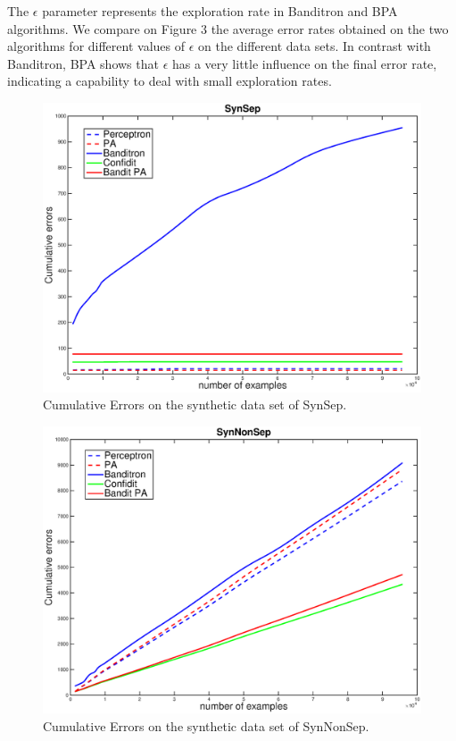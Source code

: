 \documentclass[preprint,12pt,authoryear]{elsarticle}
\begin{document}
The $\epsilon$ parameter represents the exploration rate in Banditron and BPA algorithms. We compare on Figure 3 the average error rates obtained on the two algorithms for different values of $\epsilon$ on the different data sets. In contrast with Banditron, BPA shows that $\epsilon$ has a very little influence on the final error rate, indicating a capability to deal with small exploration rates.


\begin{figure}[h!]
	
	\centerline{
		\includegraphics[scale = 0.4]{figs/SynSep.eps}
	}
	\caption{Cumulative Errors on the synthetic data set of  SynSep.}
	\label{pic:BPASS}
\end{figure}
\begin{figure}[h!]
	
	\centerline{
		\includegraphics[scale = 0.4]{figs/SynNonSep.eps}
	}
	\caption{Cumulative Errors on the synthetic data set of SynNonSep.}
	\label{pic:BPASNS}
\end{figure}
\end{document}
